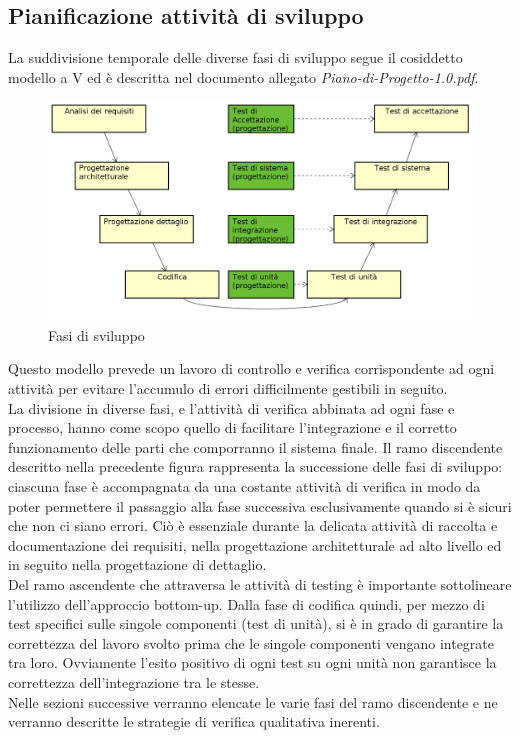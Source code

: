 \documentclass[a4paper,11pt]{article}
\begin{document}
\subsection{Pianificazione attività di sviluppo}
La suddivisione temporale delle diverse fasi di sviluppo segue il cosiddetto modello a V ed è descritta nel documento allegato \textit{Piano-di-Progetto-1.0.pdf}.
\begin{figure}[h!]
\centering
\includegraphics[scale=0.4]{../images/vmodel-final4.png}
\caption{Fasi di sviluppo}
\end{figure} 
Questo modello prevede un lavoro di controllo e verifica corrispondente ad ogni attività per evitare l'accumulo di errori difficilmente gestibili in seguito.\\
La divisione in diverse fasi, e l'attività di verifica abbinata ad ogni fase e processo, hanno come scopo quello di facilitare l'integrazione e il corretto funzionamento delle parti che comporranno il sistema finale.
Il ramo discendente descritto nella precedente figura rappresenta la successione delle fasi di sviluppo: ciascuna fase è accompagnata da una costante attività di verifica in modo da poter permettere il passaggio alla fase successiva esclusivamente quando si è sicuri che non ci siano errori. Ciò è essenziale durante la delicata attività di raccolta e documentazione dei requisiti, nella progettazione architetturale ad alto livello ed in seguito nella progettazione di dettaglio.\\ 
Del ramo ascendente che attraversa le attività di testing è importante sottolineare l'utilizzo dell'approccio bottom-up.
Dalla fase di codifica quindi, per mezzo di test specifici sulle singole componenti (test di unità), si è in grado di garantire la correttezza del lavoro svolto prima che le singole componenti vengano integrate tra loro. Ovviamente l'esito positivo di ogni test su ogni unità non garantisce la correttezza dell'integrazione tra le stesse. \\
Nelle sezioni successive verranno elencate le varie fasi del ramo discendente e ne verranno descritte le strategie di verifica qualitativa inerenti.
\end{document}
